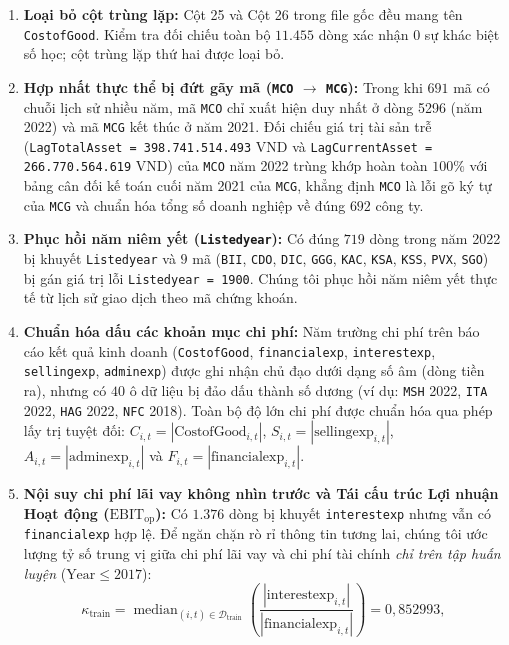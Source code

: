 \documentclass[11pt,a4paper]{article}
\begin{document}
\begin{enumerate}
    \item \textbf{Loại bỏ cột trùng lặp:} Cột 25 và Cột 26 trong file gốc đều mang tên \texttt{CostofGood}. Kiểm tra đối chiếu toàn bộ $11.455$ dòng xác nhận $0$ sự khác biệt số học; cột trùng lặp thứ hai được loại bỏ.
    \item \textbf{Hợp nhất thực thể bị đứt gãy mã (\texttt{MCO} $\to$ \texttt{MCG}):} Trong khi $691$ mã có chuỗi lịch sử nhiều năm, mã \texttt{MCO} chỉ xuất hiện duy nhất ở dòng 5296 (năm 2022) và mã \texttt{MCG} kết thúc ở năm 2021. Đối chiếu giá trị tài sản trễ (\texttt{LagTotalAsset = 398.741.514.493} VND và \texttt{LagCurrentAsset = 266.770.564.619} VND) của \texttt{MCO} năm 2022 trùng khớp hoàn toàn $100\%$ với bảng cân đối kế toán cuối năm 2021 của \texttt{MCG}, khẳng định \texttt{MCO} là lỗi gõ ký tự của \texttt{MCG} và chuẩn hóa tổng số doanh nghiệp về đúng $692$ công ty.
    \item \textbf{Phục hồi năm niêm yết (\texttt{Listedyear}):} Có đúng $719$ dòng trong năm 2022 bị khuyết \texttt{Listedyear} và $9$ mã (\texttt{BII}, \texttt{CDO}, \texttt{DIC}, \texttt{GGG}, \texttt{KAC}, \texttt{KSA}, \texttt{KSS}, \texttt{PVX}, \texttt{SGO}) bị gán giá trị lỗi \texttt{Listedyear = 1900}. Chúng tôi phục hồi năm niêm yết thực tế từ lịch sử giao dịch theo mã chứng khoán.
    \item \textbf{Chuẩn hóa dấu các khoản mục chi phí:} Năm trường chi phí trên báo cáo kết quả kinh doanh (\texttt{CostofGood}, \texttt{financialexp}, \texttt{interestexp}, \texttt{sellingexp}, \texttt{adminexp}) được ghi nhận chủ đạo dưới dạng số âm (dòng tiền ra), nhưng có $40$ ô dữ liệu bị đảo dấu thành số dương (ví dụ: \texttt{MSH} 2022, \texttt{ITA} 2022, \texttt{HAG} 2022, \texttt{NFC} 2018). Toàn bộ độ lớn chi phí được chuẩn hóa qua phép lấy trị tuyệt đối: $C_{i,t} = |\text{CostofGood}_{i,t}|$, $S_{i,t} = |\text{sellingexp}_{i,t}|$, $A_{i,t} = |\text{adminexp}_{i,t}|$ và $F_{i,t} = |\text{financialexp}_{i,t}|$.
    \item \textbf{Nội suy chi phí lãi vay không nhìn trước và Tái cấu trúc Lợi nhuận Hoạt động ($\text{EBIT}_{\text{op}}$):} Có $1.376$ dòng bị khuyết \texttt{interestexp} nhưng vẫn có \texttt{financialexp} hợp lệ. Để ngăn chặn rò rỉ thông tin tương lai, chúng tôi ước lượng tỷ số trung vị giữa chi phí lãi vay và chi phí tài chính \textit{chỉ trên tập huấn luyện} ($\text{Year} \le 2017$):
    \begin{equation}
        \kappa_{\text{train}} = \operatorname{median}_{(i,t) \in \mathcal{D}_{\text{train}}} \left( \frac{|\text{interestexp}_{i,t}|}{|\text{financialexp}_{i,t}|} \right) = 0,852993,

\end{equation}
\end{enumerate}
\end{document}
